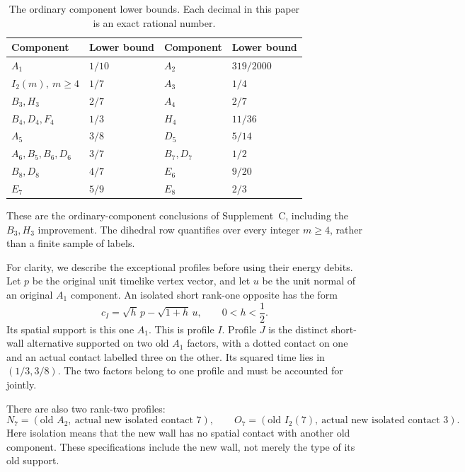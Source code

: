\begin{table}[htbp]
\centering
\caption{The ordinary component lower bounds. Each decimal in this paper
is an exact rational number.}\label{c:ordinary-table}
\begin{tabular}{ll@{\qquad}ll}
\toprule
Component&Lower bound&Component&Lower bound\\\midrule
$A_1$&$1/10$&$A_2$&$319/2000$\\
$I_2(m),\ m\ge4$&$1/7$&$A_3$&$1/4$\\
$B_3,H_3$&$2/7$&$A_4$&$2/7$\\
$B_4,D_4,F_4$&$1/3$&$H_4$&$11/36$\\
$A_5$&$3/8$&$D_5$&$5/14$\\
$A_6,B_5,B_6,D_6$&$3/7$&$B_7,D_7$&$1/2$\\
$B_8,D_8$&$4/7$&$E_6$&$9/20$\\
$E_7$&$5/9$&$E_8$&$2/3$\\\bottomrule
\end{tabular}
\end{table}

These are the ordinary-component conclusions of Supplement~C, including
the $B_3,H_3$ improvement. The dihedral row quantifies over every integer
$m\ge4$, rather than a finite sample of labels.

For clarity, we describe the exceptional profiles before using their
energy debits. Let $p$ be the original unit timelike vertex vector, and
let $u$ be the unit normal of an original $A_1$ component. An isolated
short rank-one opposite has the form
\begin{equation}\label{c:I-normal}
 c_I=\sqrt h\,p-\sqrt{1+h}\,u,
 \qquad 0<h<\frac12.
\end{equation}
Its spatial support is this one $A_1$. This is profile $I$.
Profile $J$ is the distinct short-wall alternative supported on two old
$A_1$ factors, with a dotted contact on one and an actual contact labelled
three on the other. Its squared time lies in $(1/3,3/8)$. The two factors
belong to one profile and must be accounted for jointly.

There are also two rank-two profiles:
\[
 N_7=(\text{old }A_2,\ \text{actual new isolated contact }7),
 \qquad
 O_7=(\text{old }I_2(7),\ \text{actual new isolated contact }3).
\]
Here isolation means that the new wall has no spatial contact with
another old component. These specifications include the new wall, not
merely the type of its old support.

